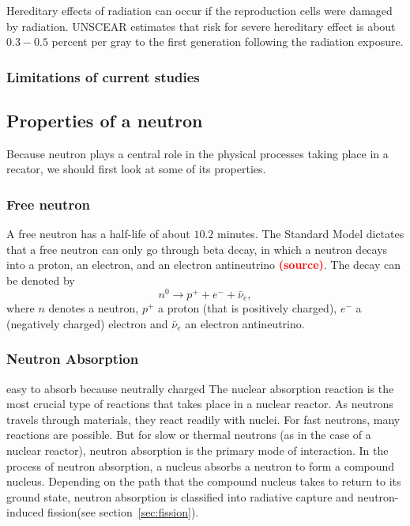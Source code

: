 \documentclass[preprint,aip,pra]{revtex4-1}
\newcommand{\red}[1]{\textcolor{red}{\bf #1}}
\begin{document}
        Hereditary effects of radiation can occur if the reproduction cells were damaged by radiation.
        UNSCEAR estimates that risk for severe hereditary effect is about $0.3-0.5$ percent per gray to
        the first generation following the radiation exposure.\cite{u16, unscear12}

        \subsubsection{Limitations of current studies}
    \subsection{Properties of a neutron}
        Because neutron plays a central role in the physical processes taking
        place in a recator, we should first look at some of its
        properties.
        \subsubsection{Free neutron}
        A free neutron has a half-life of about $10.2$ minutes. \cite{gc01} The Standard
        Model dictates that a free neutron can only go through beta decay, in which a neutron decays
        into a proton, an electron, and an electron antineutrino \red{(source)}. The decay can be denoted by
        \begin{equation}
            n^0 \rightarrow p^+ + e^- + \bar{\nu}_e,
        \end{equation}
        where $n$ denotes a neutron, $p^+$ a proton (that is positively charged), $e^-$ a
        (negatively charged) electron and $\bar{\nu}_e$ an electron antineutrino.

        \subsubsection{Neutron Absorption}
        easy to absorb because neutrally charged
        The nuclear absorption reaction is the most crucial type of reactions that takes place in
        a nuclear reactor. As neutrons travels through materials, they react readily with nuclei.
        For fast neutrons, many reactions are possible. But for slow or thermal neutrons (as in the
        case of a nuclear reactor), neutron absorption is the primary mode of interaction.
        In the process of neutron absorption, a nucleus absorbs a neutron to form
        a compound nucleus. Depending on the path that the compound nucleus takes to return to its ground
        state, neutron absorption is classified into radiative capture and neutron-induced
        fission(see section~\ref{sec:fission}).
        
\end{document}
